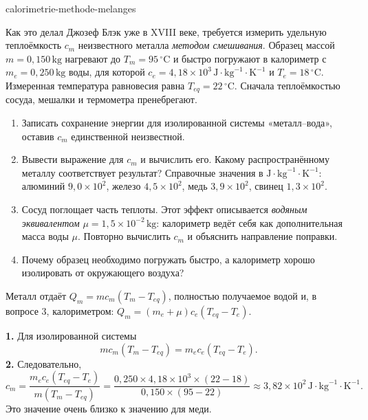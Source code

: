 \begin{exo}{calorimetrie-methode-melanges}

Как это делал Джозеф Блэк уже в XVIII веке, требуется измерить удельную теплоёмкость $c_m$ неизвестного металла \emph{методом смешивания}. Образец массой $m=0{,}150\,\text{kg}$ нагревают до $T_m=95\,^\circ\text{C}$ и быстро погружают в калориметр с $m_e=0{,}250\,\text{kg}$ воды, для которой $c_e=4{,}18\times10^3\,\text{J}\!\cdot\!\text{kg}^{-1}\!\cdot\!\text{K}^{-1}$ и $T_e=18\,^\circ\text{C}$. Измеренная температура равновесия равна $T_{eq}=22\,^\circ\text{C}$. Сначала теплоёмкостью сосуда, мешалки и термометра пренебрегают.

\begin{enumerate}
  \item Записать сохранение энергии для изолированной системы «металл–вода», оставив $c_m$ единственной неизвестной.
  \item Вывести выражение для $c_m$ и вычислить его. Какому распространённому металлу соответствует результат? Справочные значения в $\text{J}\!\cdot\!\text{kg}^{-1}\!\cdot\!\text{K}^{-1}$: алюминий $9{,}0\times10^2$, железо $4{,}5\times10^2$, медь $3{,}9\times10^2$, свинец $1{,}3\times10^2$.
  \item Сосуд поглощает часть теплоты. Этот эффект описывается \emph{водяным эквивалентом} $\mu=1{,}5\times10^{-2}\,\text{kg}$: калориметр ведёт себя как дополнительная масса воды $\mu$. Повторно вычислить $c_m$ и объяснить направление поправки.
  \item Почему образец необходимо погружать быстро, а калориметр хорошо изолировать от окружающего воздуха?
\end{enumerate}
\begin{indication}
Металл отдаёт $Q_m=mc_m(T_m-T_{eq})$, полностью получаемое водой и, в вопросе 3, калориметром: $Q_m=(m_e+\mu)c_e(T_{eq}-T_e)$.
\end{indication}
\begin{solution}
\textbf{1.} Для изолированной системы
\[
mc_m(T_m-T_{eq})=m_ec_e(T_{eq}-T_e).
\]
\textbf{2.} Следовательно,
\[
c_m=\frac{m_ec_e(T_{eq}-T_e)}{m(T_m-T_{eq})}
=\frac{0{,}250\times4{,}18\times10^3\times(22-18)}{0{,}150\times(95-22)}
\approx3{,}82\times10^2\,\text{J}\!\cdot\!\text{kg}^{-1}\!\cdot\!\text{K}^{-1}.
\]
Это значение очень близко к значению для меди.


\end{solution}
\end{exo}
